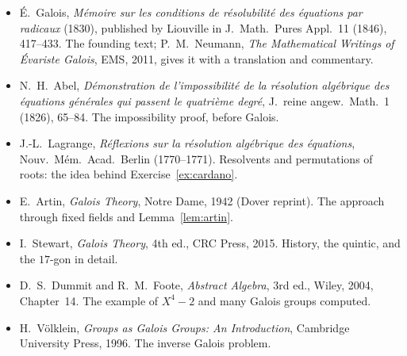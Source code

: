 \begin{itemize}
\item \'E.~Galois, \emph{Mémoire sur les conditions de résolubilité des équations par radicaux} (1830), published by Liouville in J.\ Math.\ Pures Appl.\ 11 (1846), 417--433. The founding text; P.~M.~Neumann, \emph{The Mathematical Writings of Évariste Galois}, EMS, 2011, gives it with a translation and commentary.
\item N.~H.~Abel, \emph{Démonstration de l'impossibilité de la résolution algébrique des équations générales qui passent le quatrième degré}, J.\ reine angew.\ Math.\ 1 (1826), 65--84. The impossibility proof, before Galois.
\item J.-L.~Lagrange, \emph{Réflexions sur la résolution algébrique des équations}, Nouv.\ Mém.\ Acad.\ Berlin (1770--1771). Resolvents and permutations of roots: the idea behind Exercise~\ref{ex:cardano}.
\item E.~Artin, \emph{Galois Theory}, Notre Dame, 1942 (Dover reprint). The approach through fixed fields and Lemma~\ref{lem:artin}.
\item I.~Stewart, \emph{Galois Theory}, 4th ed., CRC Press, 2015. History, the quintic, and the $17$-gon in detail.
\item D.~S.~Dummit and R.~M.~Foote, \emph{Abstract Algebra}, 3rd ed., Wiley, 2004, Chapter~14. The example of $X^4-2$ and many Galois groups computed.
\item H.~Völklein, \emph{Groups as Galois Groups: An Introduction}, Cambridge University Press, 1996. The inverse Galois problem.
\end{itemize}
